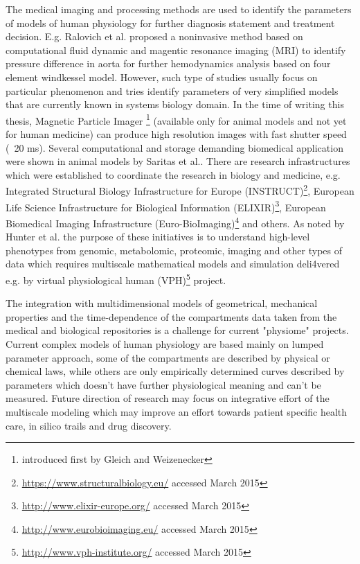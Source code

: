 The medical imaging and processing methods are used to identify the parameters of models of human physiology for further diagnosis statement and treatment decision. E.g. Ralovich et al.\cite{Ralovich2012} proposed a noninvasive method based on computational fluid dynamic and magentic resonance imaging (MRI) to identify pressure difference in aorta for further hemodynamics analysis based on four element windkessel model. However, such type of studies usually focus on particular phenomenon and tries identify parameters of very simplified models that are currently known in systems biology domain. In the time of writing this thesis, Magnetic Particle Imager \footnote{introduced first by Gleich and Weizenecker\cite{Gleich2005}} (available only for animal models and not yet for human medicine) can produce high resolution images with fast shutter speed (~20 ms). Several computational and storage demanding biomedical application were shown in animal models by Saritas et al.\cite{Saritas2013}. There are research infrastructures which were established to coordinate the research in biology and medicine, e.g.   Integrated Structural Biology Infrastructure for Europe (INSTRUCT)\footnote{\url{https://www.structuralbiology.eu/} accessed March 2015}, European Life Science Infrastructure for Biological Information (ELIXIR)\footnote{\url{http://www.elixir-europe.org/} accessed March 2015},  European Biomedical Imaging Infrastructure (Euro-BioImaging)\footnote{\url{http://www.eurobioimaging.eu/} accessed March 2015} and others. As noted by Hunter et al.\cite{Hunter2013} the purpose of these initiatives is to understand high-level phenotypes from genomic, metabolomic, proteomic, imaging and other types of data which requires multiscale mathematical models and simulation deli4vered e.g. by virtual physiological human (VPH)\footnote{\url{http://www.vph-institute.org/} accessed March 2015} project. 

The integration with multidimensional models of geometrical, mechanical properties and the time-dependence of the compartments data taken from the medical and biological repositories is a challenge for current "physiome" projects. Current complex models of human physiology are based mainly on lumped parameter approach, some of the compartments are described by physical or chemical laws, while others are only empirically determined curves described by parameters which doesn't have further physiological meaning and can't be measured.  Future direction of research may focus on integrative effort of the multiscale modeling which may improve an effort towards patient specific health care, in silico trails and drug discovery.   %

